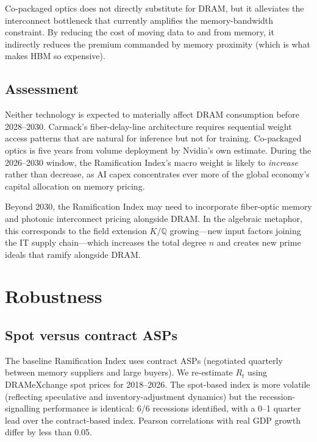 \documentclass[12pt]{article}
\theoremstyle{definition}
\newcommand{\Q}{\mathbb{Q}}
\begin{document}
Co-packaged optics does not directly substitute for DRAM, but it alleviates the interconnect bottleneck that currently amplifies the memory-bandwidth constraint. By reducing the cost of moving data to and from memory, it indirectly reduces the premium commanded by memory proximity (which is what makes HBM so expensive).

\subsection{Assessment}

Neither technology is expected to materially affect DRAM consumption before 2028--2030. Carmack's fiber-delay-line architecture requires sequential weight access patterns that are natural for inference but not for training. Co-packaged optics is five years from volume deployment by Nvidia's own estimate. During the 2026--2030 window, the Ramification Index's macro weight is likely to \emph{increase} rather than decrease, as AI capex concentrates ever more of the global economy's capital allocation on memory pricing.

Beyond 2030, the Ramification Index may need to incorporate fiber-optic memory and photonic interconnect pricing alongside DRAM. In the algebraic metaphor, this corresponds to the field extension $K/\Q$ growing---new input factors joining the IT supply chain---which increases the total degree $n$ and creates new prime ideals that ramify alongside DRAM.


\section{Robustness}
\label{sec:robustness}

\subsection{Spot versus contract ASPs}

The baseline Ramification Index uses contract ASPs (negotiated quarterly between memory suppliers and large buyers). We re-estimate $R_t$ using DRAMeXchange spot prices for 2018--2026. The spot-based index is more volatile (reflecting speculative and inventory-adjustment dynamics) but the recession-signalling performance is identical: 6/6 recessions identified, with a 0--1 quarter lead over the contract-based index. Pearson correlations with real GDP growth differ by less than 0.05.
\end{document}
